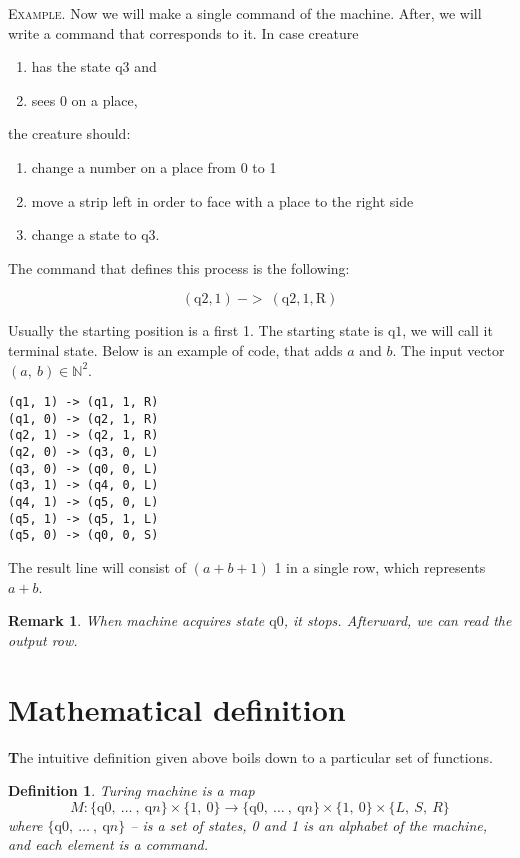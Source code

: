 \documentclass[12pt]{article}
\newcommand\tab[1][-1em]{\hspace*{#1}}
\newtheorem*{remark}{Remark}
\newtheorem{definition}{Definition}[section]
\begin{document}
 \vspace{5mm}
\begin{addmargin}[3em]{3em}
\tab
\textsc{Example.} Now we will make a single command of the machine. After, we will write a command that corresponds to it. In case creature
\begin{enumerate}
\item has the state $\mathrm{q}3$ and \item sees 0 on a place,
\end{enumerate}
the creature should: 
\begin{enumerate}
\item change a number on a place from 0 to 1 \item move a strip left in order to face with a place to the right side \item change a state to $\mathrm{q}3$. 
\end{enumerate}


The command that defines this process is the following:

{\large $$(\mathrm{q}2, 1)\ ->\ (\mathrm{q}2, 1, \mathrm{R})$$}
\end{addmargin}
Usually the starting position is a first 1. The starting state is $\mathrm{q}1$, we will call it terminal state.
Below is an example of code, that adds $a$ and $b$. The input vector $(a,\ b)\in\mathbb{N}^2$.

\begin{lstlisting}
(q1, 1) -> (q1, 1, R)
(q1, 0) -> (q2, 1, R)
(q2, 1) -> (q2, 1, R)
(q2, 0) -> (q3, 0, L)
(q3, 0) -> (q0, 0, L)
(q3, 1) -> (q4, 0, L)
(q4, 1) -> (q5, 0, L)
(q5, 1) -> (q5, 1, L)
(q5, 0) -> (q0, 0, S)
\end{lstlisting}

The result line will consist of $(a+b+1)$ 1 in a single row, which represents $a+b$.
\begin{remark} When machine acquires state $\mathrm{q}0$, it stops. Afterward, we can read the output row.
\end{remark}

\section{Mathematical definition}
\textbf{\large T}he intuitive definition given above boils down to a particular set of functions. 
\begin{definition}
Turing machine is a map
$$ M:\{\mathrm{q}0,\ \dots\ ,\ \mathrm{q}n\} \times \{ 1,\ 0\} \rightarrow \{\mathrm{q}0,\ \dots\ ,\ \mathrm{q}n\} \times \{ 1,\ 0\} \times \{L,\ S,\ R\}$$
where $\{\mathrm{q}0,\ \dots\ ,\ \mathrm{q}n\}$ -- is a set of states, 0 and 1 is an alphabet of the machine, and each element is a command.
\end{definition}
\end{document}
